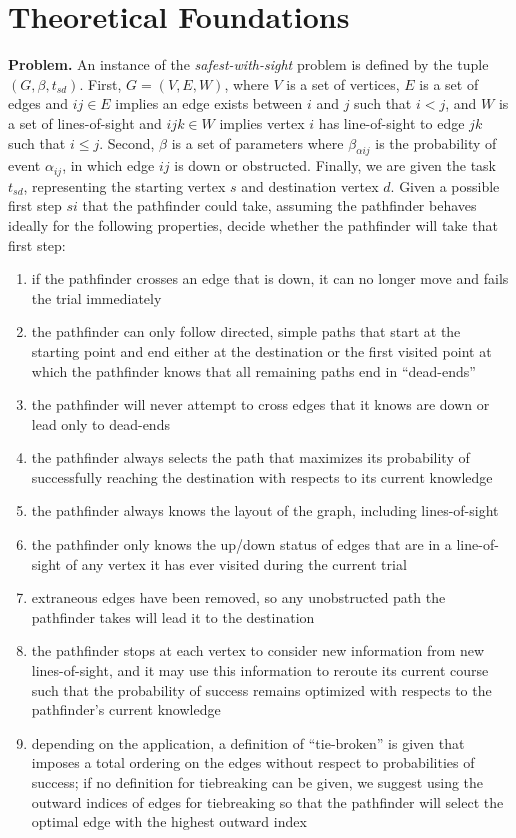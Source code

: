 \documentclass{article}
\begin{document}
    \section{Theoretical Foundations}\label{theoretical-foundations}

    \textbf{Problem.} An instance of the \emph{safest-with-sight} problem is
defined by the tuple $(G, \beta, t_{sd})$. First, $G=(V, E, W)$, where
$V$ is a set of vertices, $E$ is a set of edges and $ij \in E$ implies
an edge exists between $i$ and $j$ such that $i < j$, and $W$ is a set
of lines-of-sight and $ijk \in W$ implies vertex $i$ has line-of-sight
to edge $jk$ such that $i \le j$. Second, $\beta$ is a set of parameters
where $\beta_{\alpha ij}$ is the probability of event $\alpha_{ij}$, in
which edge $ij$ is down or obstructed. Finally, we are given the task
$t_{sd}$, representing the starting vertex $s$ and destination vertex
$d$. Given a possible first step $si$ that the pathfinder could take,
assuming the pathfinder behaves ideally for the following properties,
decide whether the pathfinder will take that first step:

\begin{enumerate}
\def\labelenumi{\arabic{enumi}.}
\itemsep1pt\parskip0pt
\item
  if the pathfinder crosses an edge that is down, it can no longer move
  and fails the trial immediately
\item
  the pathfinder can only follow directed, simple paths that start at
  the starting point and end either at the destination or the first
  visited point at which the pathfinder knows that all remaining paths
  end in ``dead-ends''
\item
  the pathfinder will never attempt to cross edges that it knows are
  down or lead only to dead-ends
\item
  the pathfinder always selects the path that maximizes its probability
  of successfully reaching the destination with respects to its current
  knowledge
\item
  the pathfinder always knows the layout of the graph, including
  lines-of-sight
\item
  the pathfinder only knows the up/down status of edges that are in a
  line-of-sight of any vertex it has ever visited during the current
  trial
\item
  extraneous edges have been removed, so any unobstructed path the
  pathfinder takes will lead it to the destination
\item
  the pathfinder stops at each vertex to consider new information from
  new lines-of-sight, and it may use this information to reroute its
  current course such that the probability of success remains optimized
  with respects to the pathfinder's current knowledge
\item
  depending on the application, a definition of ``tie-broken'' is given
  that imposes a total ordering on the edges without respect to
  probabilities of success; if no definition for tiebreaking can be
  given, we suggest using the outward indices of edges for tiebreaking
  so that the pathfinder will select the optimal edge with the highest
  outward index
\end{enumerate}
\end{document}
